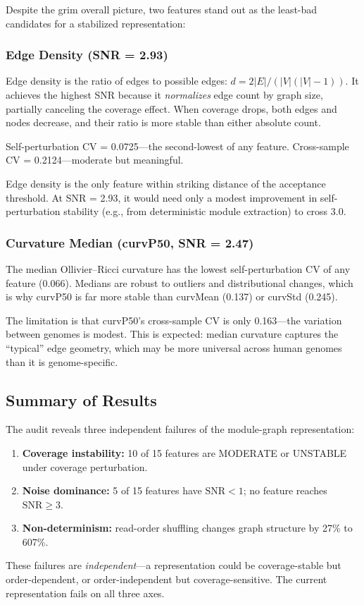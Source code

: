 \documentclass{../yalumba}
\begin{document}
Despite the grim overall picture, two features stand out as the
least-bad candidates for a stabilized representation:

\subsubsection{Edge Density (SNR = 2.93)}

Edge density is the ratio of edges to possible edges: $d = 2|E| /
(|V|(|V|-1))$.  It achieves the highest SNR because it
\emph{normalizes} edge count by graph size, partially canceling the
coverage effect.  When coverage drops, both edges and nodes decrease,
and their ratio is more stable than either absolute count.

Self-perturbation CV = 0.0725---the second-lowest of any feature.
Cross-sample CV = 0.2124---moderate but meaningful.

\begin{keyfinding}
Edge density is the only feature within striking distance of the
acceptance threshold.  At SNR = 2.93, it would need only a modest
improvement in self-perturbation stability (e.g., from deterministic
module extraction) to cross 3.0.
\end{keyfinding}

\subsubsection{Curvature Median (curvP50, SNR = 2.47)}

The median Ollivier--Ricci curvature has the lowest self-perturbation
CV of any feature (0.066).  Medians are robust to outliers and
distributional changes, which is why curvP50 is far more stable than
curvMean (0.137) or curvStd (0.245).

The limitation is that curvP50's cross-sample CV is only 0.163---the
variation between genomes is modest.  This is expected: median curvature
captures the ``typical'' edge geometry, which may be more universal
across human genomes than it is genome-specific.

\subsection{Summary of Results}

\begin{keyfinding}
The audit reveals three independent failures of the module-graph
representation:
\begin{enumerate}
  \item \textbf{Coverage instability:} 10 of 15 features are
    MODERATE or UNSTABLE under coverage perturbation.
  \item \textbf{Noise dominance:} 5 of 15 features have
    $\text{SNR} < 1$; no feature reaches $\text{SNR} \geq 3$.
  \item \textbf{Non-determinism:} read-order shuffling changes
    graph structure by 27\% to 607\%.
\end{enumerate}
These failures are \emph{independent}---a representation could be
coverage-stable but order-dependent, or order-independent but
coverage-sensitive.  The current representation fails on all three axes.
\end{keyfinding}
\end{document}
